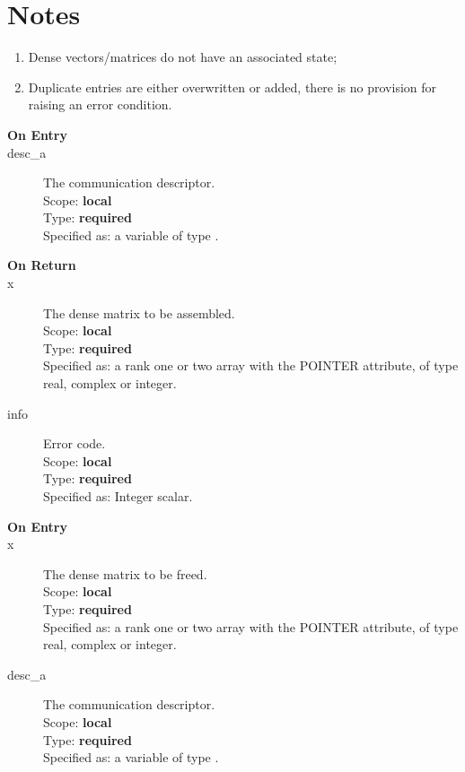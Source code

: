 \section*{Notes}
\begin{enumerate}
\item Dense vectors/matrices do not have an associated state;
\item Duplicate entries are either overwritten or added, there is no
  provision for raising an error condition. 
\end{enumerate}


%
%


\begin{description}
\item[\bf On Entry]
\item[desc\_a] The communication descriptor.\\
Scope: {\bf local} \\
Type: {\bf required}\\
Specified as: a variable of type \descdata.\\
\end{description}

\begin{description}
\item[\bf On Return]
\item[x] The dense matrix to be assembled.\\
Scope: {\bf local} \\
Type: {\bf required}\\
Specified as: a rank one or two array with the POINTER
attribute, of type real, complex or integer.\\
\item[info] Error code.\\
Scope: {\bf local} \\
Type: {\bf required}\\
Specified as: Integer scalar.\\
\end{description}
%
%


\begin{description}
\item[\bf On Entry]
\item[x] The dense matrix to
  be freed.\\
Scope: {\bf local} \\
Type: {\bf required}\\
Specified as: a rank one or two array with the POINTER
attribute, of type real, complex or integer.\\

\item[desc\_a] The communication descriptor.\\
Scope: {\bf local} \\
Type: {\bf required}\\
Specified as: a variable of type \descdata.\\
\end{description}

